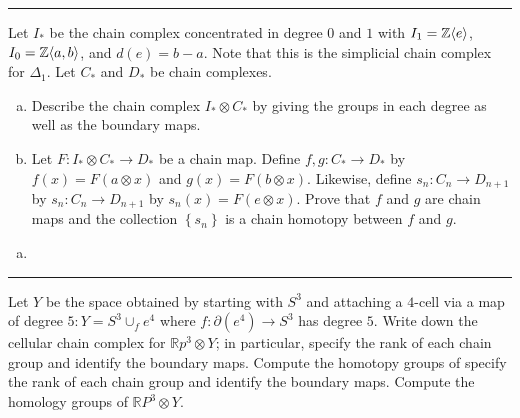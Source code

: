 \documentclass[a4paper, 12pt]{article}
\begin{document}
\noindent\rule{7in}{2.8pt}
\begin{problem}{2}
Let \(I_*\) be the chain complex concentrated in degree \(0\) and \(1\) with \(I_1=\mathbb{Z}\langle e\rangle\), \(I_0=\mathbb{Z}\langle a,b\rangle\), and \(d(e)=b-a\). Note that this is the 
simplicial chain complex for \(\Delta_1\). Let \(C_*\) and \(D_*\) be chain complexes. 
\begin{enumerate}[(a)]
\item Describe the chain complex \(I_*\otimes C_*\) by giving the groups in each degree as well as the boundary maps.
\item Let \(F:I_*\otimes C_*\rightarrow D_*\) be a chain map. Define \(f,g:C_*\rightarrow D_*\) by \(f(x)=F(a\otimes x)\) and \(g(x)=F(b\otimes x)\). Likewise, define \(s_n:C_n\rightarrow D_{n+1}\) by \(s_n:C_n\rightarrow D_{n+1}\) by \(s_n(x)=F(e\otimes x)\). Prove 
that \(f\) and \(g\) are chain maps and the collection \(\left\{ s_n \right\}\) is a chain homotopy between \(f\) and \(g\). 
\end{enumerate}
\end{problem}
\begin{solution}
\begin{enumerate}[(a)]
\item 
\end{enumerate}
\end{solution}

\noindent\rule{7in}{2.8pt}
\begin{problem}{3}
Let \(Y\) be the space obtained by starting with \(S^3\) and attaching a \(4\)-cell via a map of degree \(5:Y=S^3\cup_f e^4\) where \(f:\partial (e^4)\rightarrow S^3\) has degree \(5\). 
Write down the cellular chain complex for \(\mathbb{R}p^3\otimes Y\); in particular, specify the rank of each chain group and identify the boundary maps. Compute the homotopy groups of specify the rank of each chain group and 
identify the boundary maps. Compute the homology groups of \(\mathbb{R}P^3\otimes Y\).
\end{problem}
\begin{solution}

\end{solution}
\end{document}
